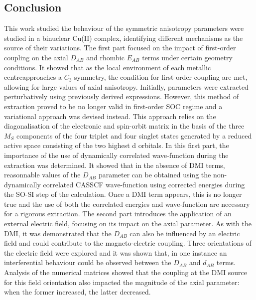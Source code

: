 \documentclass[10pt]{report}
\numberwithin{equation}{section}
\begin{document}
\newpage
\subsection{Conclusion}

This work studied the behaviour of the symmetric anisotropy parameters were studied in a binuclear Cu(II) complex, identifying different mechanisms as the source of their variations.
The first part focused on the impact of first-order coupling on the axial $D_{AB}$ and rhombic $E_{AB}$ terms under certain geometry conditions.
It showed that as the local environment of each metallic centreapproaches a $C_3$ symmetry, the condition for first-order coupling are met, allowing for large values of axial anisotropy.
Initially,  parameters were extracted perturbatively using previously derived expressions. 
However, this method of extraction proved to be no longer valid in first-order SOC regime and a variational approach was devised instead.
This approach relies on the diagonalisation of the electronic and spin-orbit matrix in the basis of the three $M_S$ components of the four triplet and four singlet states generated by a reduced active space consisting of the two highest d orbitals.
In this first part, the importance of the use of dynamically correlated wave-function during the extraction was determined.
It showed that in the absence of DMI terms, reasonnable values of the $D_{AB}$ parameter can be obtained using the non-dynamically correlated CASSCF wave-function using corrected energies during the SO-SI step of the calculation.
Once a DMI term appears, this is no longer true and the use of both the correlated energies and wave-function are necessary for a rigorous extraction.
The second part introduces the application of an external electric field, focusing on its impact on the axial parameter.
As with the DMI, it was demonstrated that the $D_{AB}$ can also be influenced by an electric field and could contribute to the magneto-electric coupling.
Three orientations of the electric field were explored and it was shown that, in one instance an interferential behaviour could be observed between the $D_{AB}$ and $d_{AB}$ terms.
Analysis of the numerical matrices showed that the coupling at the DMI source for this field orientation also impacted the magnitude of the axial parameter: when the former increased, the latter decreased.
\end{document}
